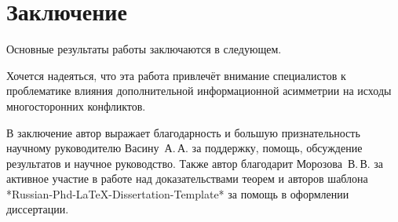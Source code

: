 \chapter*{Заключение}                       %


Основные результаты работы заключаются в следующем.

Хочется надеяться, что эта работа привлечёт внимание специалистов к проблематике влияния дополнительной информационной асимметрии на исходы многосторонних конфликтов.

В заключение автор выражает благодарность и большую признательность научному руководителю
Васину~А.\,А. за поддержку, помощь, обсуждение результатов и научное руководство. Также автор благодарит Морозова~В.\,В. за активное участие в работе над доказательствами теорем и авторов шаблона *Russian-Phd-LaTeX-Dissertation-Template* за помощь в оформлении диссертации.
